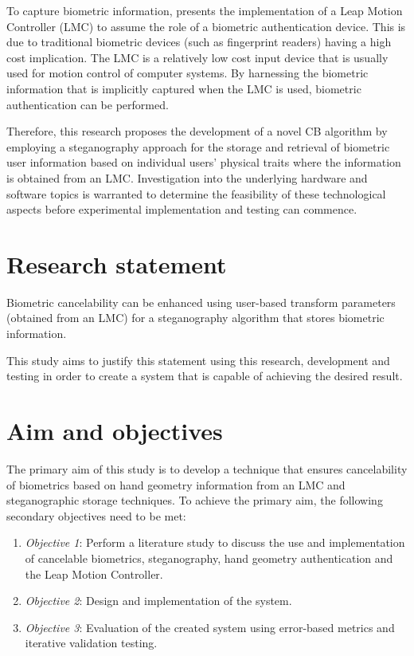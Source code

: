 To capture biometric information, \cite{Chan2015} presents the implementation of a Leap Motion Controller (LMC) to assume the role of a biometric authentication device. This is due to traditional biometric devices (such as fingerprint readers) having a high cost implication. The LMC is a relatively low cost input device that is usually used for motion control of computer systems. By harnessing the biometric information that is implicitly captured when the LMC is used, biometric authentication can be performed. 

Therefore, this research proposes the development of a novel CB algorithm by employing a steganography approach for the storage and retrieval of biometric user information based on individual users’ physical traits where the information is obtained from an LMC. Investigation into the underlying hardware and software topics is warranted to determine the feasibility of these technological aspects before experimental implementation and testing can commence.


\section{Research statement}  %
\label{section1.3}

Biometric cancelability can be enhanced using user-based transform parameters (obtained from an LMC) for a steganography algorithm that stores biometric information.

This study aims to justify this statement using this research, development and testing in order to create a system that is capable of achieving the desired result.

\section{Aim and objectives}  %
\label{section1.4}
The primary aim of this study is to develop a technique that ensures cancelability of biometrics based on hand geometry information from an LMC and steganographic storage techniques.
To achieve the primary aim, the following secondary objectives need to be met:

\begin{enumerate}[label=\roman*.]
\item \textit{Objective 1}: Perform a literature study to discuss the use and implementation of cancelable biometrics, steganography, hand geometry authentication and the Leap Motion Controller.
\item \textit{Objective 2}: Design and implementation of the system.
\item \textit{Objective 3}: Evaluation of the created system using error-based metrics and iterative validation testing.
\end{enumerate}

